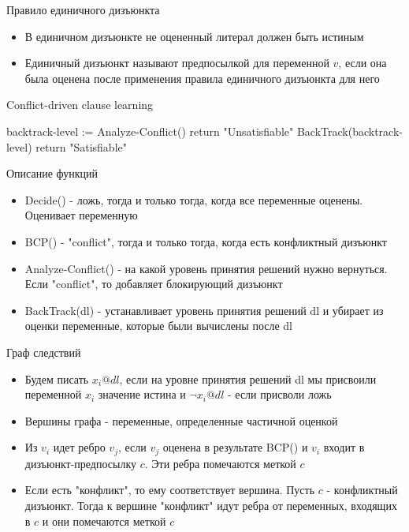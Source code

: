 \documentclass{beamer}
\begin{document}
\begin{frame}{Правило единичного дизъюнкта}
\begin{itemize}
\item В единичном дизъюнкте не оцененный литерал должен быть истиным
\item Единичный дизъюнкт называют предпосылкой для переменной $v$, если она была оценена после применения правила единичного
дизъюнкта для него
\end{itemize}
\end{frame}

\begin{frame}{Conflict-driven clause learning}
\begin{algorithmic}
            \State backtrack-level := Analyze-Conflict()
                \State return "Unsatisfiable"
            \EndIf
            \State BackTrack(backtrack-level)
                \State return "Satisfiable"
            \EndIf
        \EndWhile
    \EndWhile
\EndFunction
\end{algorithmic}
\end{frame}

\begin{frame}{Описание функций}
\begin{itemize}
\item Decide() - ложь, тогда и только тогда, когда все переменные оценены. Оценивает переменную
\item BCP() - "conflict", тогда и только тогда, когда есть конфликтный дизъюнкт
\item Analyze-Conflict() - на какой уровень принятия решений нужно вернуться. Если "conflict", то добавляет блокирующий
дизъюнкт
\item BackTrack(dl) - устанавливает уровень принятия решений dl и убирает из оценки переменные, которые были вычислены после dl
\end{itemize}
\end{frame}

\begin{frame}{Граф следствий}
\begin{itemize}
\item Будем писать $x_i@dl$, если на уровне принятия решений dl мы присвоили переменной $x_i$ значение истина и $\lnot x_i@dl$ -
если присволи ложь
\item Вершины графа - переменные, определенные частичной оценкой
\item Из $v_i$ идет ребро $v_j$, если $v_j$ оценена в результате BCP() и $v_i$ входит в дизъюнкт-предпосылку $c$. Эти ребра
помечаются меткой $c$
\item Если есть "конфликт", то ему соответствует вершина. Пусть $c$ - конфликтный дизъюнкт. Тогда к вершине "конфликт" идут
ребра от переменных, входящих в $c$ и они помечаются меткой $c$
\end{itemize}
\end{frame}
\end{document}
